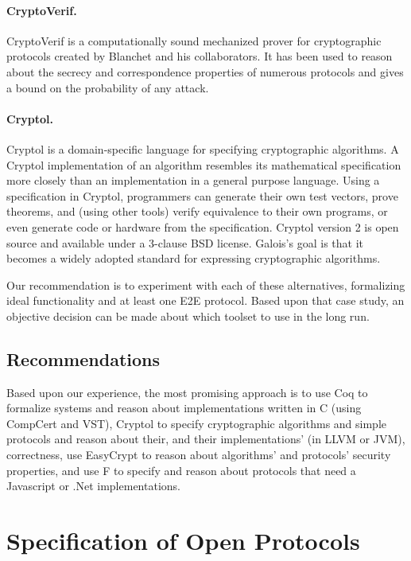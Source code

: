 \paragraph{CryptoVerif.} CryptoVerif is a computationally sound
mechanized prover for cryptographic protocols created by Blanchet and
his collaborators. It has been used to reason about the secrecy and
correspondence properties of numerous protocols and gives a bound on
the probability of any attack.

\paragraph{Cryptol.} Cryptol is a domain-specific language for
specifying cryptographic algorithms. A Cryptol implementation of an
algorithm resembles its mathematical specification more closely than
an implementation in a general purpose language. Using a specification
in Cryptol, programmers can generate their own test vectors, prove
theorems, and (using other tools) verify equivalence to their own
programs, or even generate code or hardware from the specification.
Cryptol version 2 is open source and available under a 3-clause BSD
license. Galois's goal is that it becomes a widely adopted standard
for expressing cryptographic algorithms.

Our recommendation is to experiment with each of these alternatives,
formalizing ideal functionality and at least one E2E protocol. Based
upon that case study, an objective decision can be made about which
toolset to use in the long run. 

\subsection{Recommendations}

Based upon our experience, the most promising approach is to use Coq
to formalize systems and reason about implementations written in C
(using CompCert and VST), Cryptol to specify cryptographic algorithms
and simple protocols and reason about their, and their
implementations' (in LLVM or JVM), correctness, use EasyCrypt to
reason about algorithms' and protocols' security properties, and use
F\* to specify and reason about protocols that need a Javascript or
.Net implementations.

\section{Specification of Open Protocols} 

